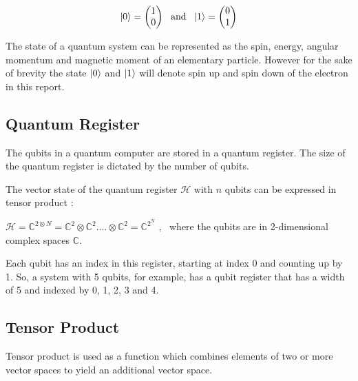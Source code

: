\documentclass{article}
\begin{document}
\begin{equation}
\ket{0} = \begin{pmatrix}1 \\ 0 \end{pmatrix} \ \ \text{and} \ \ \ket{1} = \begin{pmatrix} 0 \\ 1 \end{pmatrix}
\end{equation}

\vspace{5mm}

\noindent
The state of a quantum system can be represented as the spin, energy, angular momentum and magnetic moment of an elementary particle. However for the sake of brevity the state $\ket{0}$ and $\ket{1}$ will denote spin up and spin down of the electron in this report.
\vspace{10mm}

\subsection{Quantum Register}
\vspace{5mm}

\noindent
The qubits in a quantum computer are stored in a quantum register. The size of the quantum register is dictated by the number of qubits. 
\vspace{5mm}

\noindent
The vector state of the quantum register $\mathcal{H}$ with $n$ qubits can be expressed in tensor product \cite{noauthor_lecture_nodate}:
\vspace{5mm}


\qquad $\mathcal{H} = \mathbb{C}^{2\otimes N} = \mathbb{C}^2 \otimes\mathbb{C}^2 ....\otimes\mathbb{C}^2 = \mathbb{C}^{2^N} $ , \  where the qubits are in 2-dimensional complex spaces $\mathbb{C}$.
\vspace{5mm}

\noindent
Each qubit has an index in this register, starting at index 0 and counting up by 1. So, a system with 5 qubits, for example, has a qubit register that has a width of 5 and indexed by 0, 1, 2, 3 and 4.

\subsection{Tensor Product}
\vspace{5mm}

\noindent
Tensor product is used as a function which combines elements of two or more vector spaces to yield an additional vector space. 
\vspace{5mm}
\end{document}
